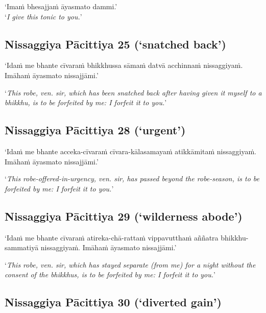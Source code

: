 ‘Imaṁ bhesajjaṁ āyasmato dammi.’\\
‘\emph{I give this tonic to you.}’ 

\subsection[NP 25 (‘snatched back’)]{Nissaggiya Pācittiya 25 (‘snatched back’)}

‘Idaṁ me bhante cīvaraṁ bhikkhussa sāmaṁ datvā acchinnaṁ nissaggiyaṁ. Imāhaṁ
āyasmato nissajjāmi.’

‘\emph{This robe, ven. sir, which has been snatched back after having given it
  myself to a bhikkhu, is to be forfeited by me: I forfeit it to you.}’



\subsection[NP 28 (‘urgent’)]{Nissaggiya Pācittiya 28 (‘urgent’)}

‘Idaṁ me bhante acceka-cīvaraṁ cīvara-kālasamayaṁ atikkāmitaṁ nissaggiyaṁ.
Imāhaṁ āyasmato nissajjāmi.’

‘\emph{This robe-offered-in-urgency, ven. sir, has passed beyond the
  robe-season, is to be forfeited by me: I forfeit it to you.}’



\subsection[NP 29 (‘wilderness abode’)]{Nissaggiya Pācittiya 29 (‘wilderness abode’)}

‘Idaṁ me bhante cīvaraṁ atireka-chā-rattaṁ vippavutthaṁ aññatra
bhikkhu-sammatiyā nissaggiyaṁ. Imāhaṁ āyasmato nissajjāmi.’

‘\emph{This robe, ven. sir, which has stayed separate (from me) for a night
  without the consent of the bhikkhus, is to be forfeited by me: I forfeit it to
  you.}’



\subsection[NP 30 (‘diverted gain’)]{Nissaggiya Pācittiya 30 (‘diverted gain’)}

